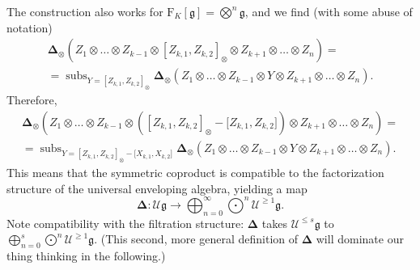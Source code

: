 \documentclass[11pt,a4paper]{amsart}
\DeclareMathOperator*{\subs}{subs}
\newcommand{\bo}{\boldsymbol}
\theoremstyle{definition}
\theoremstyle{plain}
\begin{document}
The construction also works for $\mathrm F_K[\mathfrak g]=\textstyle{\bigotimes^n\mathfrak g}$,
 and we find (with some abuse of notation)
\begin{multline*}\bo\Delta_\otimes(Z_{ 1}\otimes \ldots\otimes Z_{ {k-1}}\otimes[Z_{ {k,1}},Z_{ {k,2}} ]_{\otimes}\otimes Z_{ {k+1}}\otimes \ldots \otimes Z_{ n})
=\\=\subs_{Y=[Z_{ {k,1}},Z_{ {k,2}} ]_\otimes}
\bo\Delta_\otimes(Z_{ 1}\otimes \ldots\otimes Z_{ {k-1}}\otimes Y \otimes Z_{ {k+1}}\otimes \ldots  \otimes Z_{ n}).
\end{multline*}
Therefore,
\begin{multline*}\bo\Delta_\otimes(Z_{ 1}\otimes \ldots\otimes Z_{ {k-1}}\otimes
\left([Z_{ {k,1}},Z_{ {k,2}} ]_{\otimes}-\bo[Z_{k,1},Z_{k,2}\bo]\right)\otimes Z_{ {k+1}}\otimes \ldots \otimes Z_{ n})
=\\=\subs_{Y=[Z_{ {k,1}},Z_{ {k,2}} ]_\otimes-\bo[X_{k,1},X_{k,2}\bo]}
\bo\Delta_\otimes(Z_{ 1}\otimes \ldots\otimes Z_{ {k-1}}\otimes Y \otimes Z_{ {k+1}}\otimes \ldots  \otimes Z_{ n}).
\end{multline*}
This means that the symmetric coproduct is compatible to the factorization structure
 of the universal enveloping algebra, yielding a map
\[\bo\Delta:\mathcal U\mathfrak g\rightarrow\bigoplus_{n=0}^\infty\textstyle{\bigodot^n}
\mathcal U^{\geq1}\mathfrak g.\]
Note compatibility with the filtration structure: $\bo\Delta$ takes
$\mathcal U^{\leq s}\mathfrak g$ to $\bigoplus_{n=0}^s\textstyle{\bigodot^n} \mathcal U^{\geq1}\mathfrak g$.
(This second, more general definition of $\bo\Delta$ will dominate our thing thinking in the following.)
\end{document}
